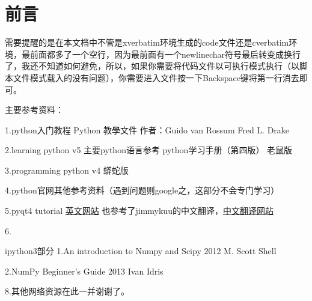 \documentclass[12pt,oneside]{book}
\begin{document}
\frontmatter

\author{万泽}
\titleLB

\chapter*{前言}
\begin{common-format}
需要提醒的是在本文档中不管是xverbatim环境生成的code文件还是cverbatim环境，最前面都多了一个空行，因为最前面有一个newlinechar符号最后转变成换行了，我还不知道如何避免，所以，如果你需要将代码文件以可执行模式执行（以脚本文件模式载入的没有问题），你需要进入文件按一下Backspace键将第一行消去即可。

主要参考资料：

1.python入门教程 Python 教學文件 作者：Guido van Rossum  Fred L. Drake

2.learning python v5  主要python语言参考   python学习手册（第四版） 老鼠版

3.programming python v4 蟒蛇版

4.python官网其他参考资料（遇到问题则google之，这部分不会专门学习）

5.pyqt4 tutorial \href{http://zetcode.com/gui/pyqt4/}{英文网站} 也参考了jimmykuu的中文翻译，\href{http://blog.cx125.com/books/PyQt4_Tutorial/}{中文翻译网站}

6.

ipython3部分
1.An introduction to Numpy and Scipy  2012 M. Scott Shell

2.NumPy Beginner's Guide 2013 Ivan Idris

8.其他网络资源在此一并谢谢了。


\end{common-format}


\setcounter{tocdepth}{2}
\tableofcontents
\end{document}
